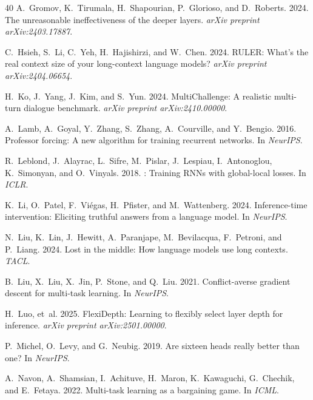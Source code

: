 \documentclass[11pt]{article}
\begin{document}
\begin{thebibliography}{40}
A.~Gromov, K.~Tirumala, H.~Shapourian, P.~Glorioso, and D.~Roberts. 2024.
\newblock The unreasonable ineffectiveness of the deeper layers.
\newblock \emph{arXiv preprint arXiv:2403.17887}.

C.~Hsieh, S.~Li, C.~Yeh, H.~Hajishirzi, and W.~Chen. 2024.
\newblock RULER: What's the real context size of your long-context language models?
\newblock \emph{arXiv preprint arXiv:2404.06654}.

H.~Ko, J.~Yang, J.~Kim, and S.~Yun. 2024.
\newblock MultiChallenge: A realistic multi-turn dialogue benchmark.
\newblock \emph{arXiv preprint arXiv:2410.00000}.

A.~Lamb, A.~Goyal, Y.~Zhang, S.~Zhang, A.~Courville, and Y.~Bengio. 2016.
\newblock Professor forcing: A new algorithm for training recurrent networks.
\newblock In \emph{NeurIPS}.

R.~Leblond, J.~Alayrac, L.~Sifre, M.~Pislar, J.~Lespiau, I.~Antonoglou, K.~Simonyan, and O.~Vinyals. 2018.
: Training RNNs with global-local losses.
\newblock In \emph{ICLR}.

K.~Li, O.~Patel, F.~Vi{\'e}gas, H.~Pfister, and M.~Wattenberg. 2024.
\newblock Inference-time intervention: Eliciting truthful answers from a language model.
\newblock In \emph{NeurIPS}.

N.~Liu, K.~Lin, J.~Hewitt, A.~Paranjape, M.~Bevilacqua, F.~Petroni, and P.~Liang. 2024.
\newblock Lost in the middle: How language models use long contexts.
\newblock \emph{TACL}.

B.~Liu, X.~Liu, X.~Jin, P.~Stone, and Q.~Liu. 2021.
\newblock Conflict-averse gradient descent for multi-task learning.
\newblock In \emph{NeurIPS}.

H.~Luo, et~al. 2025.
\newblock FlexiDepth: Learning to flexibly select layer depth for inference.
\newblock \emph{arXiv preprint arXiv:2501.00000}.

P.~Michel, O.~Levy, and G.~Neubig. 2019.
\newblock Are sixteen heads really better than one?
\newblock In \emph{NeurIPS}.

A.~Navon, A.~Shamsian, I.~Achituve, H.~Maron, K.~Kawaguchi, G.~Chechik, and E.~Fetaya. 2022.
\newblock Multi-task learning as a bargaining game.
\newblock In \emph{ICML}.


\end{thebibliography}
\end{document}
